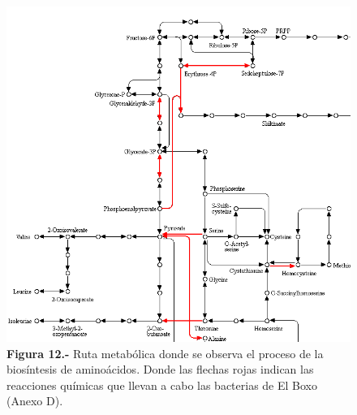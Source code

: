 \documentclass[12pt,letterpaper,oneside]{report}
\begin{document}
\begin{figure}[!h]
\centering
\includegraphics[width=15.59cm]{figuras/IMG_13}
\caption*{\textbf{Figura 12.-} Ruta metabólica donde se observa el proceso de la biosíntesis de aminoácidos. Donde las flechas rojas indican las reacciones químicas que llevan a cabo las bacterias de El Boxo (Anexo D).}
\label{Figura 13}
\end{figure}
\newpage
\end{document}
